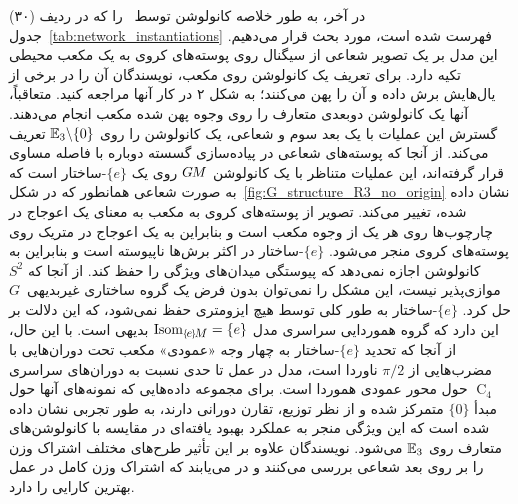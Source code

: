 در آخر، به طور خلاصه کانولوشن توسط~\citet{boomsma2017spherical} را که در ردیف (۳۰) جدول~\ref{tab:network_instantiations} فهرست شده است، مورد بحث قرار می‌دهیم.
این مدل بر یک تصویر شعاعی از سیگنال روی پوسته‌های کروی به یک مکعب محیطی تکیه دارد.
برای تعریف یک کانولوشن روی مکعب، نویسندگان آن را در برخی از یال‌هایش برش داده و آن را پهن می‌کنند؛ به شکل ۲ در کار آنها مراجعه کنید.
متعاقباً، آنها یک کانولوشن دوبعدی متعارف را روی وجوه پهن شده مکعب انجام می‌دهند.
گسترش این عملیات با یک بعد سوم و شعاعی، یک کانولوشن را روی $\mathbb{E}_3 \backslash \{0\}$ تعریف می‌کند.
از آنجا که پوسته‌های شعاعی در پیاده‌سازی گسسته دوباره با فاصله مساوی قرار گرفته‌اند، این عملیات متناظر با یک کانولوشن $G\mkern-1.4muM$ روی یک $\{e\}$-ساختار است که به صورت شعاعی همانطور که در شکل~\ref{fig:G_structure_R3_no_origin} نشان داده شده، تغییر می‌کند.
تصویر از پوسته‌های کروی به مکعب به معنای یک اعوجاج در چارچوب‌ها روی هر یک از وجوه مکعب است و بنابراین به یک اعوجاج در متریک روی پوسته‌های کروی منجر می‌شود.
$\{e\}$-ساختار در اکثر برش‌ها ناپیوسته است و بنابراین به کانولوشن اجازه نمی‌دهد که پیوستگی میدان‌های ویژگی را حفظ کند.
از آنجا که $S^2$ موازی‌پذیر نیست، این مشکل را نمی‌توان بدون فرض یک گروه ساختاری غیربدیهی~$G$ حل کرد.
$\{e\}$-ساختار به طور کلی توسط هیچ ایزومتری حفظ نمی‌شود، که این دلالت بر این دارد که گروه هموردایی سراسری مدل $\IsomeM = \{e\}$ بدیهی است.
با این حال، از آنجا که تحدید $\{e\}$-ساختار به چهار وجه «عمودی» مکعب تحت دوران‌هایی با مضرب‌هایی از $\pi/2$ ناوردا است، مدل در عمل تا حدی نسبت به دوران‌های سراسری $\operatorname{C}_4$ حول محور عمودی هموردا است.
برای مجموعه داده‌هایی که نمونه‌های آنها حول مبدأ $\{0\}$ متمرکز شده و از نظر توزیع، تقارن دورانی دارند، به طور تجربی نشان داده شده است که این ویژگی منجر به عملکرد بهبود یافته‌ای در مقایسه با کانولوشن‌های متعارف روی $\mathbb{E}_3$ می‌شود.
نویسندگان علاوه بر این تأثیر طرح‌های مختلف اشتراک وزن را بر روی بعد شعاعی بررسی می‌کنند و در می‌یابند که اشتراک وزن کامل در عمل بهترین کارایی را دارد.